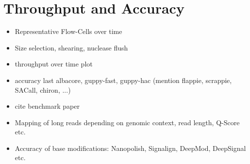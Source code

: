 \section{Throughput and Accuracy}

\begin{itemize}
    \item Representative Flow-Cells over time
    \item Size selection, shearing, nuclease flush
    \item throughput over time plot
    \item accuracy last albacore, guppy-fast, guppy-hac (mention flappie, scrappie, SACall, chiron, ...)
    \item cite benchmark paper
    \item Mapping of long reads depending on genomic context, read length, Q-Score etc.
    \item Accuracy of base modifications: Nanopolish, Signalign, DeepMod, DeepSignal etc.
\end{itemize}